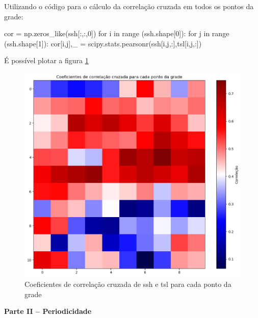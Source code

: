 \documentclass[12pt,a4paper,portuguese]{article}
\begin{document}
	Utilizando o código para o cálculo da correlação cruzada em todos os pontos da grade:
	\begin{python}
cor = np.zeros_like(ssh[:,:,0])
for i in range (ssh.shape[0]):
	for j in range (ssh.shape[1]):
		cor[i,j],_ = scipy.stats.pearsonr(ssh[i,j,:],tsl[i,j,:])
	\end{python}
	É possível plotar a figura \ref{fig:lista3-3c}
	
\begin{figure}[H]
	\centering
	\includegraphics[width=1\linewidth]{lista3-3c}
	\caption{Coeficientes de correlação cruzada de ssh e tsl para cada ponto da grade}
	\label{fig:lista3-3c}
\end{figure}
	
\textbf{Parte II – Periodicidade}
	
\end{document}
